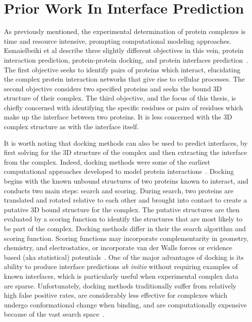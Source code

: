 

\chapter{Prior Work In Interface Prediction}
\label{chap:relatedwork} 


As previously mentioned, the experimental determination of protein complexes is time and resource intensive, prompting computational modeling approaches.
Esmaielbeiki et al describe three slightly different objectives in this vein, protein interaction prediction, protein-protein docking, and protein interfaces prediction~\cite{esmaielbeiki2015}.
The first objective seeks to identify pairs of proteins which interact, elucidating the complex protein interaction networks that give rise to cellular processes. 
The second objective considers two specified proteins and seeks the bound 3D structure of their complex.
The third objective, and the focus of this thesis, is chiefly concerned with identifying the specific residues or pairs of residues which make up the interface between two proteins.
It is less concerned with the 3D complex structure as with the interface itself.

It is worth noting that docking methods can also be used to predict interfaces, by first solving for the 3D structure of the complex and then extracting the interface from the complex.
Indeed, docking methods were some of the earliest computational approaches developed to model protein interactions~\cite{janin1995}.
Docking begins with the known unbound structures of two proteins known to interact, and conducts two main steps: search and scoring.
During search, two proteins are translated and rotated relative to each other and brought into contact to create a putative 3D bound structure for the complex.
The putative structures are then evaluated by a scoring function to identify the structures that are most likely to be part of the complex.
Docking methods differ in their the search algorithm and scoring function.
Scoring functions may incorporate complementarity in geometry, chemistry, and electrostatics, or incorporate van der Walls forces or evidence based (aka statistical) potentials~\cite{tuncbag2011}\cite{janin1995}.
One of the major advantages of docking is its ability to produce interface predictions \textit{ab initio} without requiring examples of known interfaces, which is particularly useful when experimental complex data are sparse.
Unfortunately, docking methods traditionally suffer from relatively high false positive rates, are considerably less effective for complexes which undergo conformational change when binding, and are computationally expensive because of the vast search space~\cite{janin1995}\cite{tuncbag2011}.

